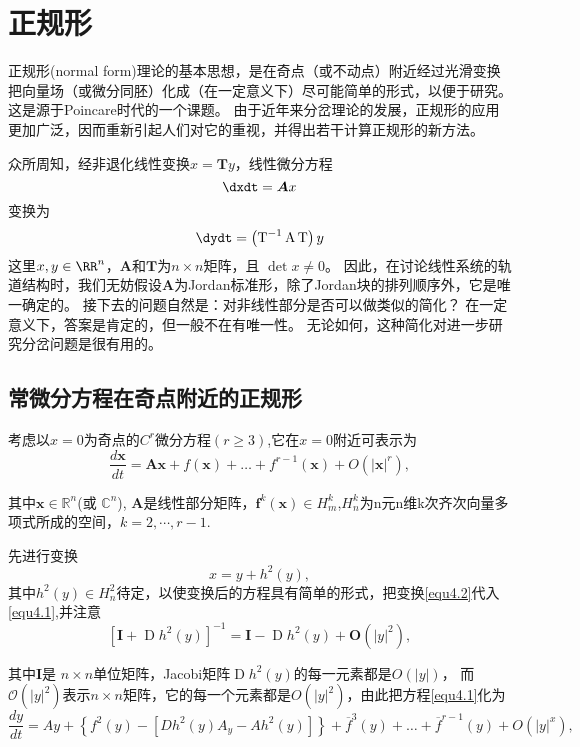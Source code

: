 \section{正规形}

正规形(normal form)理论的基本思想，是在奇点（或不动点）附近经过光滑变换把向量场（或微分同胚）化成（在一定意义下）尽可能简单的形式，以便于研究。
这是源于Poincare时代的一个课题。
由于近年来分岔理论的发展，正规形的应用更加广泛，因而重新引起人们对它的重视，并得出若干计算正规形的新方法。

众所周知，经非退化线性变换$x = \boldsymbol { T } y$，线性微分方程
\[
\dxdt = \boldsymbol { A } x
\]
变换为
\[
\dydt=
  \left( \operatorname{T} ^ { - 1 } \operatorname{A}  \operatorname{T}  \right) y
\]
这里$x , y \in \RR^ { n }$，$\mathbf{A}$和$\mathbf{T}$为$n \times n$矩阵，且
$\operatorname { det } x \neq 0$。
因此，在讨论线性系统的轨道结构时，我们无妨假设\(\mathbf{A}\)为Jordan标准形，除了Jordan块的排列顺序外，它是唯一确定的。
接下去的问题自然是：对非线性部分是否可以做类似的简化？
在一定意义下，答案是肯定的，但一般不在有唯一性。
无论如何，这种简化对进一步研究分岔问题是很有用的。

\subsection{常微分方程在奇点附近的正规形}
考虑以\(x=0\)为奇点的\(C^r\)微分方程$( r \geqslant 3 )$,它在\(x=0\)附近可表示为
\begin{equation}
\frac { d \boldsymbol{x} } { d t } = \mathbf{A} \boldsymbol{x} + f ( \boldsymbol{x}) + \dots + f ^ { r - 1 } ( \boldsymbol{x} ) + O \left( | \boldsymbol{x}| ^ { r } \right),
\label{eq:1.4.1}
\end{equation}

其中$\boldsymbol{x} \in \mathbb { R } ^ { n }$(或 \(\mathbb{C}^n\)),
\(\mathbf{A}\)是线性部分矩阵，$\boldsymbol{f}^ { k } ( \boldsymbol{x} ) \in H _ { m } ^ { k } $,$ H _ { n } ^ { k }$为n元n维k次齐次向量多项式所成的空间，$k = 2 , \cdots  , r - 1$.


先进行变换
\begin{equation}
    \label{eq:1.4.2}
x = y + h ^ { 2 } ( y ),
\end{equation}
其中$h ^ { 2 } ( y ) \in H _ { n } ^ { 2 }$待定，以使变换后的方程具有简单的形式，把变换\ref{equ4.2}代入\ref{equ4.1},并注意
\[
\left[\boldsymbol  I + \operatorname D h ^ { 2 } ( y ) \right] ^ { - 1 } =  \boldsymbol I -\operatorname D h ^ { 2 } ( y ) +\boldsymbol O\left( | y | ^ { 2 } \right),
\]

其中\(\boldsymbol I\)是 \(n \times n\)单位矩阵，Jacobi矩阵$\operatorname D h ^ { 2 } ( y )$的每一元素都是$O ( | y | )$，
而$\mathscr O \left( | y | ^ { 2 } \right)$表示\(n \times n\)矩阵，它的每一个元素都是$O \left( | y | ^ { 2 } \right)$，由此把方程\ref{equ4.1}化为
\begin{equation}
  \frac { d y } { d t } =
  A y + \left\{ f ^ { 2 } ( y ) -
    \left[ D h ^ { 2 } ( y ) A _ { y } - A h ^ { 2 } ( y ) \right] \right\}
  + \overline { f } ^ { 3 } ( y ) +\dots + \overline { f } ^ { r - 1 } ( y ) + O \left( | y | ^ { x } \right),
  \label{eq:1.4.3}
\end{equation}

